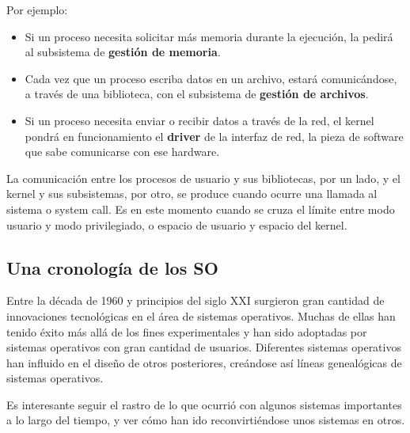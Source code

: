 \documentclass[spanish,a4paper,]{article}
\providecommand{\tightlist}{%
  \setlength{\itemsep}{0pt}\setlength{\parskip}{0pt}}
\begin{document}
Por ejemplo:

\begin{itemize}
\tightlist
\item
  Si un proceso necesita solicitar más memoria durante la ejecución, la
  pedirá al subsistema de \textbf{gestión de memoria}.
\item
  Cada vez que un proceso escriba datos en un archivo, estará
  comunicándose, a través de una biblioteca, con el subsistema de
  \textbf{gestión de archivos}.
\item
  Si un proceso necesita enviar o recibir datos a través de la red, el
  kernel pondrá en funcionamiento el \textbf{driver} de la interfaz de
  red, la pieza de software que sabe comunicarse con ese hardware.
\end{itemize}

La comunicación entre los procesos de usuario y sus bibliotecas, por un
lado, y el kernel y sus subsistemas, por otro, se produce cuando ocurre
una llamada al sistema o system call. Es en este momento cuando se cruza
el límite entre modo usuario y modo privilegiado, o espacio de usuario y
espacio del kernel.

\hypertarget{una-cronologuxeda-de-los-so}{%
\subsection{Una cronología de los
SO}\label{una-cronologuxeda-de-los-so}}

Entre la década de 1960 y principios del siglo XXI surgieron gran
cantidad de innovaciones tecnológicas en el área de sistemas operativos.
Muchas de ellas han tenido éxito más allá de los fines experimentales y
han sido adoptadas por sistemas operativos con gran cantidad de
usuarios. Diferentes sistemas operativos han influido en el diseño de
otros posteriores, creándose así líneas genealógicas de sistemas
operativos.

Es interesante seguir el rastro de lo que ocurrió con algunos sistemas
importantes a lo largo del tiempo, y ver cómo han ido reconvirtiéndose
unos sistemas en otros.
\end{document}
